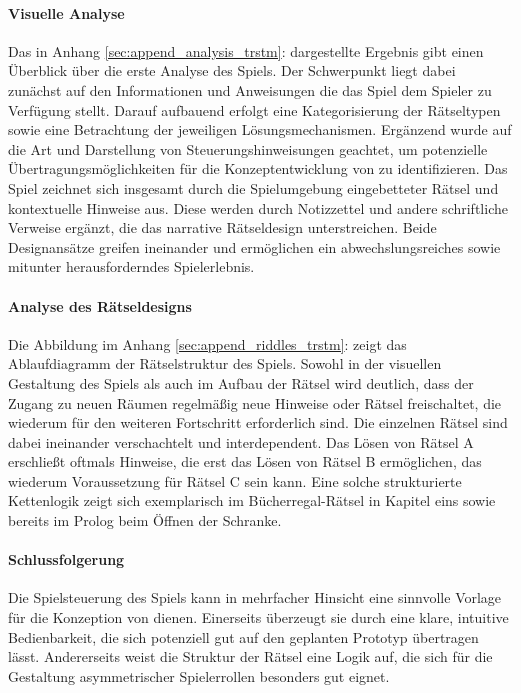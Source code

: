 \paragraph{Visuelle Analyse}
Das in Anhang \ref{sec:append_analysis_trstm}:  dargestellte Ergebnis gibt einen Überblick über die erste Analyse des Spiels. Der Schwerpunkt liegt dabei zunächst auf den Informationen und Anweisungen die das Spiel dem Spieler zu Verfügung stellt. Darauf aufbauend erfolgt eine Kategorisierung der Rätseltypen sowie eine Betrachtung der jeweiligen Lösungsmechanismen. Ergänzend wurde auf die Art und Darstellung von Steuerungshinweisungen geachtet, um potenzielle Übertragungsmöglichkeiten für die Konzeptentwicklung von  zu identifizieren. Das Spiel zeichnet sich insgesamt durch die Spielumgebung eingebetteter Rätsel und kontextuelle Hinweise aus. Diese werden durch Notizzettel und andere schriftliche Verweise ergänzt, die das narrative Rätseldesign unterstreichen. Beide Designansätze greifen ineinander und ermöglichen ein abwechslungsreiches sowie mitunter herausforderndes Spielerlebnis.

\paragraph{Analyse des Rätseldesigns}
Die Abbildung im Anhang \ref{sec:append_riddles_trstm}:  zeigt das Ablaufdiagramm der Rätselstruktur des Spiels. Sowohl in der visuellen Gestaltung des Spiels als auch im Aufbau der Rätsel wird deutlich, dass der Zugang zu neuen Räumen regelmäßig neue Hinweise oder Rätsel freischaltet, die wiederum für den weiteren Fortschritt erforderlich sind. Die einzelnen Rätsel sind dabei ineinander verschachtelt und interdependent. Das Lösen von Rätsel A erschließt oftmals Hinweise, die erst das Lösen von Rätsel B ermöglichen, das wiederum Voraussetzung für Rätsel C sein kann. Eine solche strukturierte Kettenlogik zeigt sich exemplarisch im Bücherregal-Rätsel in Kapitel eins sowie bereits im Prolog beim Öffnen der Schranke.

\paragraph{Schlussfolgerung}
Die Spielsteuerung des Spiels kann in mehrfacher Hinsicht eine sinnvolle Vorlage für die Konzeption von  dienen. Einerseits überzeugt sie durch eine klare, intuitive Bedienbarkeit, die sich potenziell gut auf den geplanten Prototyp übertragen lässt. Andererseits weist die Struktur der Rätsel eine Logik auf, die sich für die Gestaltung asymmetrischer Spielerrollen besonders gut eignet.

